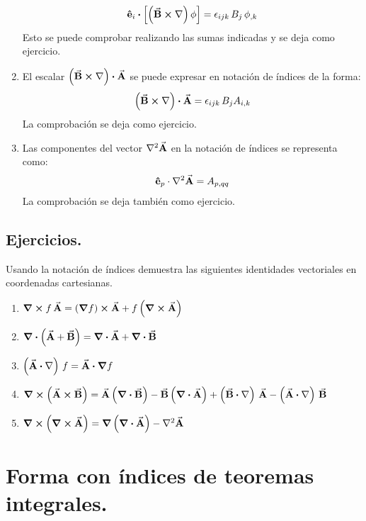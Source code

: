 \documentclass[hidelinks,12pt]{article}
\begin{document}
\begin{enumerate}
\begin{align*}
\vu{e}_{i} \vdot \left[ \left( \va{B} \cross \nabla \right) \phi \right] = \epsilon_{ijk} \, B_{j} \, \phi_{,k}
\end{align*}
Esto se puede comprobar realizando las sumas indicadas y se deja como ejercicio.
\item El escalar $\left( \va{B} \cross \nabla \right) \vdot \va{A}$ se puede expresar en notación de índices de la forma:
\begin{align*}
\left( \va{B} \cross \nabla \right) \vdot \va{A} = \epsilon_{ijk} \, B_{j} A_{i,k}
\end{align*}
La comprobación se deja como ejercicio.
\item Las componentes del vector $\laplacian{\va{A}}$ en la notación de índices se representa como:
\begin{align*}
\vu{e}_{p} \cdot \laplacian{\va{A}} = A_{p, qq}
\end{align*}
La comprobación se deja también como ejercicio.
\end{enumerate}

\subsection{Ejercicios.}

Usando la notación de índices demuestra las siguientes identidades vectoriales en coordenadas cartesianas.

\begin{enumerate}[label=\roman*)]
\item $\curl{f \, \va{A}} = \left( \grad{f} \right) \cross \va{A} + f \left( \curl{\va{A}} \right)$
\item $\divergence{\left( \va{A} + \va{B} \right)} = \divergence{\va{A}} + \divergence{\va{B}}$
\item $\left( \va{A} \vdot \nabla \right) \, f = \va{A} \vdot \grad{f}$
\item $\curl{\left( \va{A} \cross \va{B} \right)} = \va{A} \left( \divergence{\va{B}} \right) - \va{B} \left( \divergence{\va{A}} \right) + \left( \va{B} \vdot \nabla \right) \, \va{A} - \left( \va{A} \vdot \nabla \right) \, \va{B}$
\item $\curl{\left( \curl{\va{A}} \right)} = \grad{\left( \divergence{\va{A}} \right)} - \laplacian{\va{A}}$
\end{enumerate}

\section{Forma con índices de teoremas integrales.}
\end{document}
